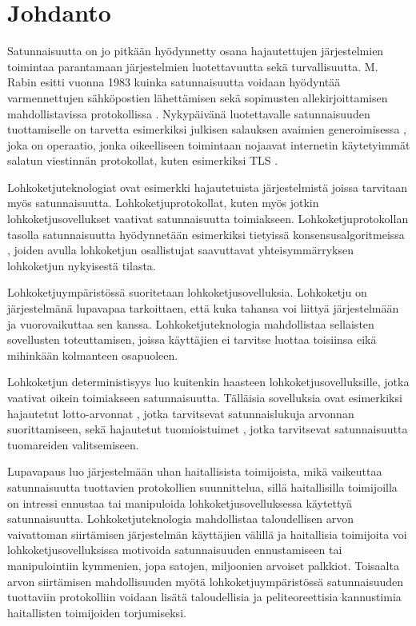 \chapter{Johdanto\label{intro}}

Satunnaisuutta on jo pitkään hyödynnetty osana hajautettujen järjestelmien toimintaa parantamaan järjestelmien luotettavuutta sekä turvallisuutta. M. Rabin esitti vuonna 1983 kuinka satunnaisuutta voidaan hyödyntää varmennettujen sähköpostien lähettämisen sekä sopimusten allekirjoittamisen mahdollistavissa protokollissa \cite{rabin_transaction_1983}. Nykypäivänä luotettavalle satunnaisuuden tuottamiselle on tarvetta esimerkiksi julkisen salauksen avaimien generoimisessa \cite{corrigan-gibbs_ensuring_2014}, joka on operaatio, jonka oikeelliseen toimintaan nojaavat internetin käytetyimmät salatun viestinnän protokollat, kuten esimerkiksi TLS \cite{rescorla_transport_2018}. 

Lohkoketjuteknologiat ovat esimerkki hajautetuista järjestelmistä joissa tarvitaan myös satunnaisuutta. Lohkoketjuprotokollat, kuten myös jotkin lohkoketjusovellukset vaativat satunnaisuutta toimiakseen. Lohkoketjuprotokollan tasolla satunnaisuutta hyödynnetään esimerkiksi tietyissä konsensusalgoritmeissa \cite{gilad_algorand_2017, hanke_dfinity_2018}, joiden avulla lohkoketjun osallistujat saavuttavat yhteisymmärryksen lohkoketjun nykyisestä tilasta. 

Lohkoketjuympäristössä suoritetaan lohkoketjusovelluksia. Lohkoketju on järjestelmänä lupavapaa tarkoittaen, että kuka tahansa voi liittyä järjestelmään ja vuorovaikuttaa sen kanssa. Lohkoketjuteknologia mahdollistaa sellaisten sovellusten toteuttamisen, joissa käyttäjien ei tarvitse luottaa toisiinsa eikä mihinkään kolmanteen osapuoleen.

Lohkoketjun deterministisyys luo kuitenkin haasteen lohkoketjusovelluksille, jotka vaativat oikein toimiakseen satunnaisuutta. Tälläisia sovelluksia ovat esimerkiksi hajautetut lotto-arvonnat \cite{pooltogether_pooltogether_nodate}, jotka tarvitsevat satunnaislukuja arvonnan suorittamiseen, sekä hajautetut tuomioistuimet \cite{lesaege_kleros_2020}, jotka tarvitsevat satunnaisuutta tuomareiden valitsemiseen. 

Lupavapaus luo järjestelmään uhan haitallisista toimijoista, mikä vaikeuttaa satunnaisuutta tuottavien protokollien suunnittelua, sillä haitallisilla toimijoilla on intressi ennustaa tai manipuloida lohkoketjusovelluksessa käytettyä satunnaisuutta. Lohkoketjuteknologia mahdollistaa taloudellisen arvon vaivattoman siirtämisen järjestelmän käyttäjien välillä ja haitallisia toimijoita voi lohkoketjusovelluksissa motivoida satunnaisuuden ennustamiseen tai manipulointiin kymmenien, jopa satojen, miljoonien arvoiset palkkiot. Toisaalta arvon siirtämisen mahdollisuuden myötä lohkoketjuympäristössä satunnaisuuden tuottaviin protokolliin voidaan lisätä taloudellisia ja peliteoreettisia kannustimia haitallisten toimijoiden torjumiseksi.

